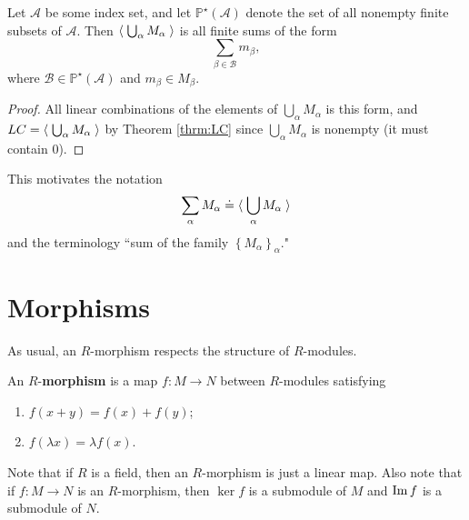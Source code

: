 \documentclass[twoside,10pt]{report}
\begin{document}
\begin{prop}
	Let $\mathcal{A}$ be some index set, and let $\mathbb{P}^{\star}(\mathcal{A})$ denote the set of all nonempty finite subsets of $\mathcal{A}$. Then $\left\langle \;\bigcup_{\alpha}M_{\alpha}\; \right\rangle$ is all finite sums of the form
	\[
	\sum_{\beta \in \mathcal{B}} m_{\beta},
	\] where $\mathcal{B} \in \mathbb{P}^{\star}(\mathcal{A})$ and $m_{\beta} \in M_{\beta}$.
\end{prop}
\begin{proof}
	All linear combinations of the elements of $\bigcup_{\alpha}M_{\alpha}$ is this form, and $LC = \left\langle \;\bigcup_{\alpha}M_{\alpha}\; \right\rangle$ by Theorem \ref{thrm:LC} since $\bigcup_{\alpha}M_{\alpha}$ is nonempty (it must contain 0).
\end{proof}
This motivates the notation
\[
\sum_{\alpha}M_{\alpha} \doteq \langle \; \bigcup_{\alpha}M_{\alpha}\; \rangle
\] 
and the terminology ``sum of the family $\left\{ M_{\alpha} \right\}_{\alpha}$."


\section{Morphisms}

As usual, an $R$-morphism respects the structure of $R$-modules.
\begin{defn}[]
An $R$-\textbf{morphism} is a map $f:M\to N$ between $R$-modules satisfying
\begin{enumerate}
	\item $f(x+y) = f(x) + f(y)$;
	\item $f(\lambda x) = \lambda f(x)$.
\end{enumerate}
\end{defn}

Note that if $R$ is a field, then an $R$-morphism is just a linear map. Also note that if $f:M\to N$ is an $R$-morphism, then $\ker f$ is a submodule of $M$ and $\operatorname{Im} f$ is a submodule of $N$.
\end{document}
